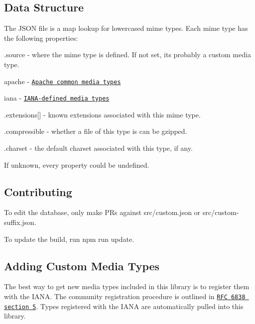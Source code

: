 \subsection*{Data Structure}

The J\+S\+O\+N file is a map lookup for lowercased mime types. Each mime type has the following properties\+:


\begin{DoxyItemize}
\item {\ttfamily .source} -\/ where the mime type is defined. If not set, it\textquotesingle{}s probably a custom media type.
\begin{DoxyItemize}
\item {\ttfamily apache} -\/ \href{http://svn.apache.org/repos/asf/httpd/httpd/trunk/docs/conf/mime.types}{\tt Apache common media types}
\item {\ttfamily iana} -\/ \href{http://www.iana.org/assignments/media-types/media-types.xhtml}{\tt I\+A\+N\+A-\/defined media types}
\end{DoxyItemize}
\item {\ttfamily .extensions\mbox{[}\mbox{]}} -\/ known extensions associated with this mime type.
\item {\ttfamily .compressible} -\/ whether a file of this type is can be gzipped.
\item {\ttfamily .charset} -\/ the default charset associated with this type, if any.
\end{DoxyItemize}

If unknown, every property could be {\ttfamily undefined}.

\subsection*{Contributing}

To edit the database, only make P\+Rs against {\ttfamily src/custom.\+json} or {\ttfamily src/custom-\/suffix.\+json}.

To update the build, run {\ttfamily npm run update}.

\subsection*{Adding Custom Media Types}

The best way to get new media types included in this library is to register them with the I\+A\+N\+A. The community registration procedure is outlined in \href{http://tools.ietf.org/html/rfc6838#section-5}{\tt R\+F\+C 6838 section 5}. Types registered with the I\+A\+N\+A are automatically pulled into this library. 